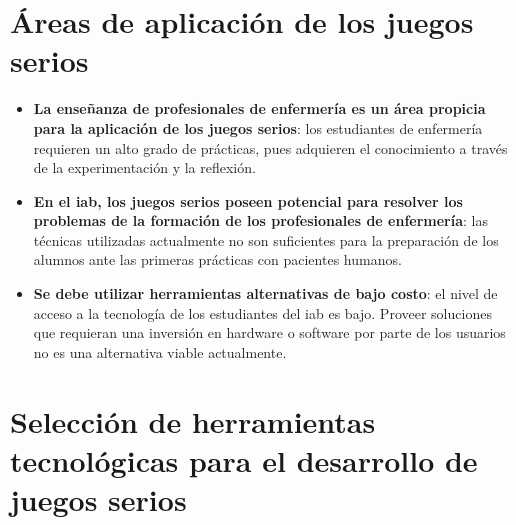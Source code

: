 \section[Áreas de aplicación]%
{Áreas de aplicación de los juegos serios}

\begin{itemize}

\item \textbf{La enseñanza de profesionales de enfermería es un área propicia para la aplicación de los juegos serios}: los estudiantes de enfermería requieren un alto grado de prácticas, pues adquieren el conocimiento a través de la experimentación y la reflexión\cite{humphreys2013developing}.

\item \textbf{En el \gls{iab}, los juegos serios poseen potencial para resolver los problemas de la formación de los profesionales de enfermería}: las técnicas utilizadas actualmente no son suficientes para la preparación de los alumnos ante las primeras prácticas con pacientes humanos.

\item \textbf{Se debe utilizar herramientas alternativas de bajo costo}: el nivel de acceso a la tecnología de los estudiantes del \gls{iab} es bajo. Proveer soluciones que requieran una inversión en hardware o software por parte de los usuarios no es una alternativa viable actualmente.

\end{itemize}

\section[Selección de herramientas]%
{Selección de herramientas tecnológicas para el desarrollo de juegos serios}

